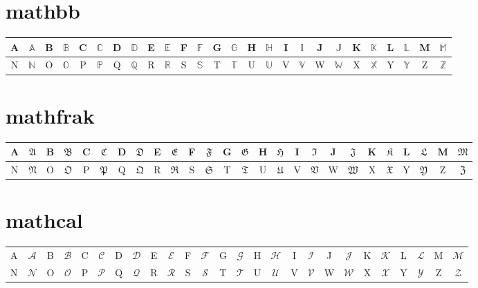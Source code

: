 \documentclass[a4paper,9pt]{scrartcl}
\begin{document}
\section{mathbb}
\begin{tabular}{|c|c||c|c||c|c||c|c||c|c||c|c||c|c||c|c||c|c||c|c||c|c||c|c||c|c|}
    \hline
    A & $\mathbb{A}$ & B & $\mathbb{B}$ & C & $\mathbb{C}$ & D & $\mathbb{D}$ & E & $\mathbb{E}$ & F & $\mathbb{F}$ & G & $\mathbb{G}$ & H & $\mathbb{H}$ & I & $\mathbb{I}$ & J & $\mathbb{J}$ & K & $\mathbb{K}$ & L & $\mathbb{L}$ & M & $\mathbb{M}$\\
    \hline
    N & $\mathbb{N}$ & O & $\mathbb{O}$ & P & $\mathbb{P}$ & Q & $\mathbb{Q}$ & R & $\mathbb{R}$ & S & $\mathbb{S}$ & T & $\mathbb{T}$ & U & $\mathbb{U}$ & V & $\mathbb{V}$ & W & $\mathbb{W}$ & X & $\mathbb{X}$ & Y & $\mathbb{Y}$ & Z & $\mathbb{Z}$\\
    \hline
\end{tabular}

\section{mathfrak}
\begin{tabular}{|c|c||c|c||c|c||c|c||c|c||c|c||c|c||c|c||c|c||c|c||c|c||c|c||c|c|}
    \hline
    A & $\mathfrak{A}$ & B & $\mathfrak{B}$ & C & $\mathfrak{C}$ & D & $\mathfrak{D}$ & E & $\mathfrak{E}$ & F & $\mathfrak{F}$ & G & $\mathfrak{G}$ & H & $\mathfrak{H}$ & I & $\mathfrak{I}$ & J & $\mathfrak{J}$ & K & $\mathfrak{K}$ & L & $\mathfrak{L}$ & M & $\mathfrak{M}$\\
    \hline
    N & $\mathfrak{N}$ & O & $\mathfrak{O}$ & P & $\mathfrak{P}$ & Q & $\mathfrak{Q}$ & R & $\mathfrak{R}$ & S & $\mathfrak{S}$ & T & $\mathfrak{T}$ & U & $\mathfrak{U}$ & V & $\mathfrak{V}$ & W & $\mathfrak{W}$ & X & $\mathfrak{X}$ & Y & $\mathfrak{Y}$ & Z & $\mathfrak{Z}$\\
    \hline
\end{tabular}

\section{mathcal}
\begin{tabular}{|c|c||c|c||c|c||c|c||c|c||c|c||c|c||c|c||c|c||c|c||c|c||c|c||c|c|}
    \hline
    A & $\mathcal{A}$ & B & $\mathcal{B}$ & C & $\mathcal{C}$ & D & $\mathcal{D}$ & E & $\mathcal{E}$ & F & $\mathcal{F}$ & G & $\mathcal{G}$ & H & $\mathcal{H}$ & I & $\mathcal{I}$ & J & $\mathcal{J}$ & K & $\mathcal{K}$ & L & $\mathcal{L}$ & M & $\mathcal{M}$\\
    N & $\mathcal{N}$ & O & $\mathcal{O}$ & P & $\mathcal{P}$ & Q & $\mathcal{Q}$ & R & $\mathcal{R}$ & S & $\mathcal{S}$ & T & $\mathcal{T}$ & U & $\mathcal{U}$ & V & $\mathcal{V}$ & W & $\mathcal{W}$ & X & $\mathcal{X}$ & Y & $\mathcal{Y}$ & Z & $\mathcal{Z}$\\
    \hline
\end{tabular}
\end{document}
